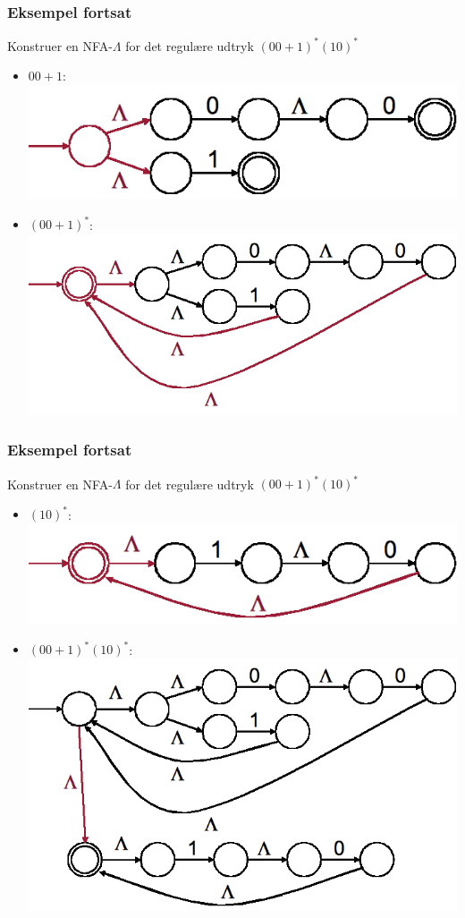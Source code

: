 \begin{frame}
\frametitle{Eksempel fortsat}
Konstruer en NFA-$\Lambda$ for det regulære udtryk $(00+1)^*(10)^*$
\begin{itemize}[<+->]
\item $00+1$:
  \includegraphics[scale=0.4]{images/2_seminar_kleene_1_ex_00plus1}
\item $(00+1)^*$:
  \includegraphics[scale=0.4]{images/2_seminar_kleene_1_ex_00plus1star}
\end{itemize}
\end{frame}
\begin{frame}
\frametitle{Eksempel fortsat}
Konstruer en NFA-$\Lambda$ for det regulære udtryk $(00+1)^*(10)^*$
\begin{itemize}[<+->]
\item $(10)^*$:
  \includegraphics[scale=0.4]{images/2_seminar_kleene_1_ex_10star}
\item $(00+1)^*(10)^*$:
  \includegraphics[scale=0.4]{images/2_seminar_kleene_1_ex_00plus1star10star}
\end{itemize}
\end{frame}
